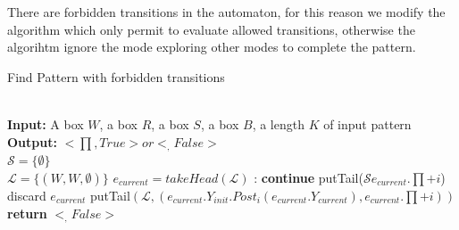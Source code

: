     There are forbidden transitions in the automaton, for this reason we 
    modify the algorithm which only permit to evaluate allowed transitions, otherwise
    the algorihtm ignore the mode exploring other modes to complete the pattern.
    
    \begin{algorithm}
      \caption{Find Pattern with forbidden transitions}\label{euclid}
      \begin{algorithmic}[1]
         \\
          \textbf{Input:} A box $W$, a box $R$,
          a box $S$, a box $B$, a length $K$ of input pattern\\
          \textbf{Output:} $<\prod,True> or <_,False>$ \\
          $\mathcal{S}= \lbrace \emptyset \rbrace$ \\
          $\mathcal{L}= \lbrace (W,W,\emptyset) \rbrace$
            \State $e_{current} = takeHead(\mathcal{L})$
            :
                \State \textbf{continue}
              \EndIf
              \label{alg:filter_transitions}
                \State putTail($\mathcal{S}e_{current}.\prod + i$)
              \Else
                  \State discard $e_{current}$
                \EndIf
                    \State putTail$(\mathcal{L},(e_{current}.Y_{init}.Post_{i}(e_{current}.Y_{current}),e_{current}.\prod+i))$
                  \EndIf              
                \EndIf
              \EndIf
            \EndFor          
          \EndWhile
          \State \textbf{return} $<_,False>$ 
        \EndProcedure    
      \end{algorithmic}
    \end{algorithm}
  
